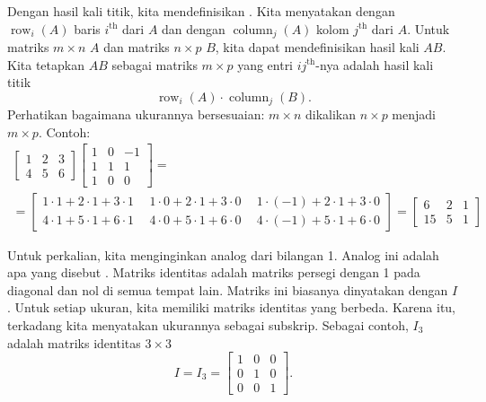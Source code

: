 Dengan hasil kali titik, kita mendefinisikan
\emph{}.
Kita menyatakan dengan $\operatorname{row}_i(A)$ baris $i^{\text{th}}$
dari $A$ dan dengan
$\operatorname{column}_j(A)$ kolom $j^{\text{th}}$ dari $A$.
Untuk matriks $m \times n$ $A$ dan matriks $n \times p$ $B$,
kita dapat mendefinisikan hasil kali $AB$.  Kita tetapkan $AB$ sebagai matriks $m \times p$
yang entri $ij^{\text{th}}$-nya adalah hasil kali titik
\begin{equation*}
\operatorname{row}_i(A) \cdot
\operatorname{column}_j(B) .
\end{equation*}
Perhatikan bagaimana ukurannya bersesuaian: $m \times n$ dikalikan $n \times p$ menjadi
$m \times p$.  Contoh:
\begin{multline*}
\begin{bmatrix}
1 & 2 & 3 \\
4 & 5 & 6
\end{bmatrix}
\begin{bmatrix}
1 & 0 & -1 \\
1 & 1 & 1 \\
1 & 0 & 0
\end{bmatrix}
= \\ =
\begin{bmatrix}
1\cdot 1 + 2\cdot 1 + 3 \cdot 1 & ~~
1\cdot 0 + 2\cdot 1 + 3 \cdot 0 & ~~
1\cdot (-1) + 2\cdot 1 + 3 \cdot 0 \\
4\cdot 1 + 5\cdot 1 + 6 \cdot 1 & ~~
4\cdot 0 + 5\cdot 1 + 6 \cdot 0 & ~~
4\cdot (-1) + 5\cdot 1 + 6 \cdot 0
\end{bmatrix}
=
\begin{bmatrix}
6 & 2 & 1 \\
15 & 5 & 1
\end{bmatrix}
\end{multline*}

Untuk perkalian, kita menginginkan analog dari bilangan 1.  Analog ini adalah
apa yang disebut \emph{}.
Matriks identitas adalah matriks persegi dengan 1 pada
diagonal dan nol di semua tempat lain.  Matriks ini biasanya dinyatakan dengan $I$.
Untuk setiap ukuran, kita memiliki matriks identitas yang berbeda.
Karena itu, terkadang kita menyatakan
ukurannya sebagai subskrip.  Sebagai contoh, $I_3$ adalah matriks identitas
$3 \times 3$
\begin{equation*}
I = I_3 =
\begin{bmatrix}
1 & 0 & 0 \\
0 & 1 & 0 \\
0 & 0 & 1
\end{bmatrix} .
\end{equation*}

